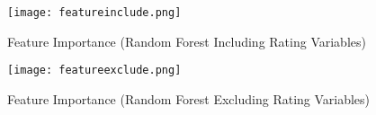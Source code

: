 \documentclass{article}
\begin{document}
\begin{figure}[H]
\centering
\texttt{[image: featureinclude.png]}
\caption{Feature Importance (Random Forest Including Rating Variables)}
\label{fig:rf_include}
\end{figure}

\begin{figure}[H]
\centering
\texttt{[image: featureexclude.png]}
\caption{Feature Importance (Random Forest Excluding Rating Variables)}
\label{fig:rf_exclude}
\end{figure}


\end{document}
